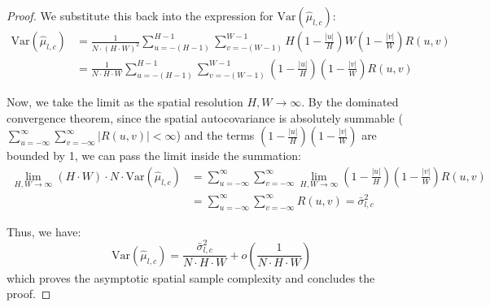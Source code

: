 \documentclass{article}
\theoremstyle{plain}
\theoremstyle{definition}
\theoremstyle{remark}
\begin{document}
\begin{proof}
We substitute this back into the expression for $\mathrm{Var}(\hat{\mu}_{l,c})$:
\begin{align}
    \mathrm{Var}(\hat{\mu}_{l,c}) &= \frac{1}{N \cdot (H \cdot W)^2} \sum_{u=-(H-1)}^{H-1} \sum_{v=-(W-1)}^{W-1} H\left(1 - \frac{|u|}{H}\right) W\left(1 - \frac{|v|}{W}\right) R(u, v) \\
    &= \frac{1}{N \cdot H \cdot W} \sum_{u=-(H-1)}^{H-1} \sum_{v=-(W-1)}^{W-1} \left(1 - \frac{|u|}{H}\right)\left(1 - \frac{|v|}{W}\right) R(u, v)
\end{align}

Now, we take the limit as the spatial resolution $H, W \to \infty$. By the dominated convergence theorem, since the spatial autocovariance is absolutely summable ($\sum_{u=-\infty}^{\infty} \sum_{v=-\infty}^{\infty} |R(u, v)| < \infty$) and the terms $\left(1 - \frac{|u|}{H}\right)\left(1 - \frac{|v|}{W}\right)$ are bounded by 1, we can pass the limit inside the summation:
\begin{align}
    \lim_{H,W \to \infty} (H \cdot W) \cdot N \cdot \mathrm{Var}(\hat{\mu}_{l,c}) &= \sum_{u=-\infty}^{\infty} \sum_{v=-\infty}^{\infty} \lim_{H,W \to \infty} \left(1 - \frac{|u|}{H}\right)\left(1 - \frac{|v|}{W}\right) R(u, v) \\
    &= \sum_{u=-\infty}^{\infty} \sum_{v=-\infty}^{\infty} R(u, v) = \bar{\sigma}^2_{l,c}
\end{align}

Thus, we have:
\begin{equation}
    \mathrm{Var}(\hat{\mu}_{l,c}) = \frac{\bar{\sigma}^2_{l,c}}{N \cdot H \cdot W} + o\left(\frac{1}{N \cdot H \cdot W}\right)
\end{equation}
which proves the asymptotic spatial sample complexity and concludes the proof.
\end{proof}
\end{document}
